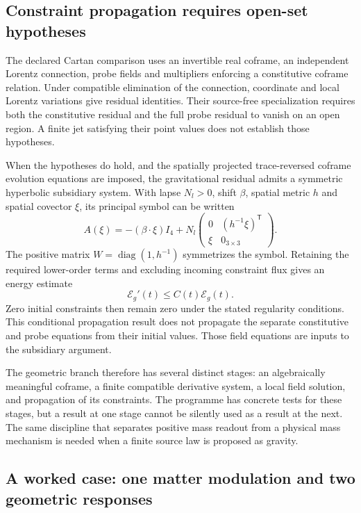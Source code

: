 \subsection{Constraint propagation requires open-set hypotheses}
The declared Cartan comparison uses an invertible real coframe, an
independent Lorentz connection, probe fields and multipliers enforcing
a constitutive coframe relation. Under compatible elimination of the
connection, coordinate and local Lorentz variations give residual
identities. Their source-free specialization requires both the
constitutive residual and the full probe residual to vanish on an
open region. A finite jet satisfying their point values does not
establish those hypotheses.

When the hypotheses do hold, and the spatially projected
trace-reversed coframe evolution equations are imposed, the
gravitational residual admits a symmetric hyperbolic subsidiary
system. With lapse $N_l>0$, shift $\beta$, spatial metric $h$ and
spatial covector $\xi$, its principal symbol can be written
\begin{equation}
 A(\xi)=-(\beta\cdot\xi)I_4+
 N_l\begin{pmatrix}0&(h^{-1}\xi)^{\mathsf T}\\
                         \xi&0_{3\times3}\end{pmatrix}.
\end{equation}
The positive matrix $W=\operatorname{diag}(1,h^{-1})$ symmetrizes
the symbol. Retaining the required lower-order terms and excluding
incoming constraint flux gives an energy estimate
\begin{equation}
 \mathcal E_g'(t)\leq C(t)\mathcal E_g(t).
\end{equation}
Zero initial constraints then remain zero under the stated regularity
conditions. This conditional propagation result does not propagate
the separate constitutive and probe equations from their initial
values. Those field equations are inputs to the subsidiary argument.

The geometric branch therefore has several distinct stages: an
algebraically meaningful coframe, a finite compatible derivative
system, a local field solution, and propagation of its constraints.
The programme has concrete tests for these stages, but a result at
one stage cannot be silently used as a result at the next. The same
discipline that separates positive mass readout from a physical mass
mechanism is needed when a finite source law is proposed as gravity.

\subsection{A worked case: one matter modulation and two geometric responses}

